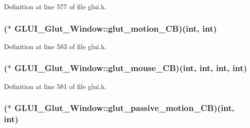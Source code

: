 Definition at line 577 of file glui.\+h.

\hypertarget{class_g_l_u_i___glut___window_ae5f6057d61f1808b2b0ab39b89a7113e}{
\subsubsection[{glut\+\_\+motion\+\_\+\+C\+B}]{($\ast$ G\+L\+U\+I\+\_\+\+Glut\+\_\+\+Window\+::glut\+\_\+motion\+\_\+\+C\+B)({\bf int}, {\bf int})}}\label{class_g_l_u_i___glut___window_ae5f6057d61f1808b2b0ab39b89a7113e}


Definition at line 583 of file glui.\+h.

\hypertarget{class_g_l_u_i___glut___window_a126b91fbf4e55fd2a099bb43c5949654}{
\subsubsection[{glut\+\_\+mouse\+\_\+\+C\+B}]{($\ast$ G\+L\+U\+I\+\_\+\+Glut\+\_\+\+Window\+::glut\+\_\+mouse\+\_\+\+C\+B)({\bf int}, {\bf int}, {\bf int}, {\bf int})}}\label{class_g_l_u_i___glut___window_a126b91fbf4e55fd2a099bb43c5949654}


Definition at line 581 of file glui.\+h.

\hypertarget{class_g_l_u_i___glut___window_afc4066e60731680d782efaed8a7bc3b1}{
\subsubsection[{glut\+\_\+passive\+\_\+motion\+\_\+\+C\+B}]{($\ast$ G\+L\+U\+I\+\_\+\+Glut\+\_\+\+Window\+::glut\+\_\+passive\+\_\+motion\+\_\+\+C\+B)({\bf int}, {\bf int})}}\label{class_g_l_u_i___glut___window_afc4066e60731680d782efaed8a7bc3b1}


